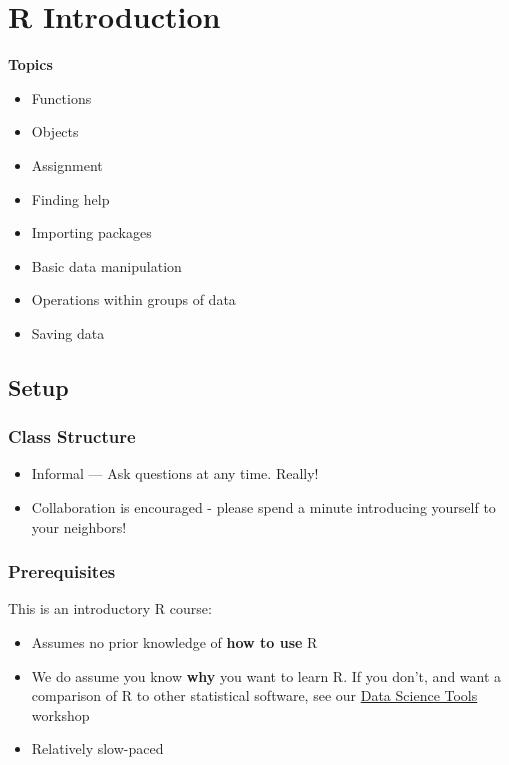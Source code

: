 \documentclass[
]{book}
\providecommand{\tightlist}{%
  \setlength{\itemsep}{0pt}\setlength{\parskip}{0pt}}
\begin{document}
\hypertarget{r-introduction}{%
\chapter{R Introduction}\label{r-introduction}}

\textbf{Topics}

\begin{itemize}
\tightlist
\item
  Functions
\item
  Objects
\item
  Assignment
\item
  Finding help
\item
  Importing packages
\item
  Basic data manipulation
\item
  Operations within groups of data
\item
  Saving data
\end{itemize}

\hypertarget{setup}{%
\section{Setup}\label{setup}}

\hypertarget{class-structure}{%
\subsection{Class Structure}\label{class-structure}}

\begin{itemize}
\tightlist
\item
  Informal --- Ask questions at any time. Really!
\item
  Collaboration is encouraged - please spend a minute introducing yourself to your neighbors!
\end{itemize}

\hypertarget{prerequisites}{%
\subsection{Prerequisites}\label{prerequisites}}

This is an introductory R course:

\begin{itemize}
\tightlist
\item
  Assumes no prior knowledge of \textbf{how to use} R
\item
  We do assume you know \textbf{why} you want to learn R. If you don't, and want a comparison of R to other statistical software, see our \href{./DataScienceTools.html}{Data Science Tools} workshop
\item
  Relatively slow-paced
\end{itemize}
\end{document}
